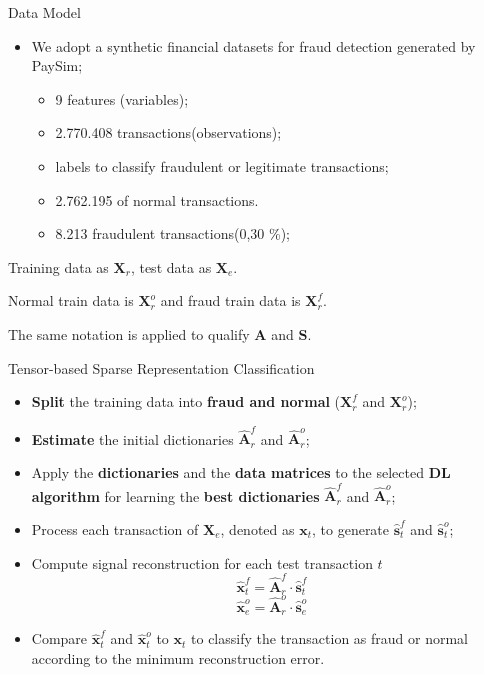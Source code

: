 \documentclass[newPxFont, numfooter, sectionpages]{beamer}
\begin{document}
\begin{frame}[c]{Data Model}

	\begin{itemize}
		\item We adopt a synthetic financial datasets for fraud detection generated by PaySim;
		\begin{itemize}
			\item 9 features (variables);
			\item 2.770.408 transactions(observations);
			\item labels to classify fraudulent or legitimate transactions;
			\item 2.762.195 of normal transactions.
			\item 8.213 fraudulent transactions(0,30 \%);
		\end{itemize}
	\end{itemize}

	Training data as $\textbf{X}_r$,  test data as $\textbf{X}_e$. 

	Normal train data is $\textbf{X}_r^o$ and fraud train data is $\textbf{X}_r^f$. 

	The same notation is applied to qualify $\textbf{A}$ and $\textbf{S}$.

\end{frame}
\begin{frame}[c]{Tensor-based Sparse Representation Classification}

	\begin{itemize}
		\item \textbf{Split} the training data into \textbf{fraud and normal} ($\textbf{X}_r^f$ and $\textbf{X}_r^o$);
		\item \textbf{Estimate} the initial dictionaries $\hat{\textbf{A}}_r^f$ and $\hat{\textbf{A}}_r^o$;
		\item Apply the \textbf{dictionaries} and the \textbf{data matrices} to the selected \textbf{DL algorithm} for learning the \textbf{best dictionaries} $\hat{\textbf{A}}_r^f$ and $\hat{\textbf{A}}_r^o$;
		\item Process each transaction of $\textbf{X}_e$, denoted as $\textbf{x}_t$, to generate  $\hat{\textbf{s}}_t^f$ and $\hat{\textbf{s}}_t^o$;
		\item Compute signal reconstruction for each test transaction $t$
			\begin{equation}\label{eq:4_eq041}
				\hat{\textbf{x}}_t^f = \hat{\textbf{A}}_r^f \cdot \hat{\textbf{s}}_t^f
			\end{equation}
			\begin{equation}\label{eq:4_eq042}
				\hat{\textbf{x}}_e^o = \hat{\textbf{A}}_r^o \cdot \hat{\textbf{s}}_e^o
			\end{equation}
		\item Compare $\hat{\textbf{x}}_t^f$ and $\hat{\textbf{x}}_t^o$ to $\textbf{x}_t$ to classify the transaction as fraud or normal according to the minimum reconstruction error.
	\end{itemize}

\end{frame}
\end{document}
